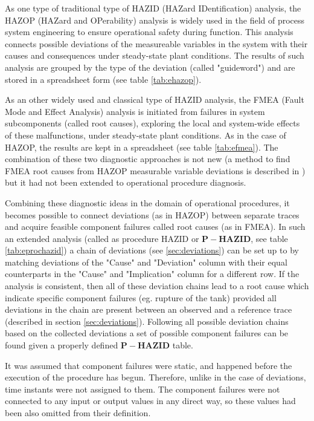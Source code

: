 \documentclass[conference]{IEEEtran}
\begin{document}
As one type of traditional type of HAZID (HAZard IDentification) analysis, the HAZOP (HAZard and OPerability) analysis is widely used in the field of process system engineering to ensure operational safety during function. This analysis connects possible deviations of the measureable variables in the system with their causes and consequences under steady-state plant conditions. The results of such analysis are grouped by the type of the deviation (called "guideword") and are stored in a spreadsheet form (see table \ref{tab:ehazop}). 

As an other widely used and classical type of HAZID analysis, the FMEA (Fault Mode and Effect Analysis) analysis is initiated from failures in system subcomponents (called root causes), exploring the local and system-wide effects of these malfunctions, under steady-state plant conditions. As in the case of HAZOP, the results are kept in a spreadsheet (see table \ref{tab:efmea}). The combination of these two diagnostic approaches is not new (a method to find FMEA root causes from HAZOP measurable variable deviations is described in \cite{com_hazop_fmea}) but it had not been extended to operational procedure diagnosis.

Combining these diagnostic ideas in the domain of operational procedures, it becomes possible to connect deviations (as in HAZOP) between separate traces and acquire feasible component failures called root causes (as in FMEA). In such an extended analysis (called as procedure HAZID or  $\mathbf{P-HAZID}$, see table \ref{tab:eprochazid}) a chain of deviations (see \ref{sec:deviations}) can be set up to by matching deviations of the "Cause" and "Deviation" column with their equal counterparts in the "Cause" and "Implication" column for a different row. If the analysis is consistent, then all of these deviation chains lead to a root cause which indicate specific component failures (eg. rupture of the tank) provided all deviations in the chain are present between an observed and a reference trace (described in section \ref{sec:deviations}). Following all possible deviation chains based on the collected deviations a set of possible component failures can be found given a properly defined $\mathbf{P-HAZID}$ table. 

It was assumed that component failures were static, and happened before the execution of the procedure has begun. Therefore, unlike in the case of deviations, time instants were not assigned to them. The component failures were not connected to any input or output values in any direct way, so these values had been also omitted from their definition. 
\end{document}
